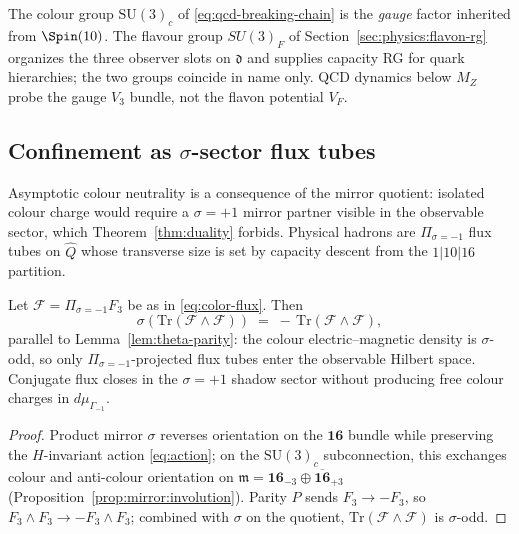 \begin{remark}
The colour group $\mathrm{SU}(3)_c$ of \eqref{eq:qcd-breaking-chain} is the
\emph{gauge} factor inherited from $\Spin(10)$. The flavour group
$SU(3)_F$ of Section~\ref{sec:physics:flavon-rg} organizes the three observer
slots on $\mathfrak{d}$ and supplies capacity RG for quark hierarchies; the
two groups coincide in name only. QCD dynamics below $M_Z$ probe the gauge
$V_3$ bundle, not the flavon potential $V_F$.
\end{remark}

\subsection{Confinement as $\sigma$-sector flux tubes}
\label{sec:qcd:confinement}

Asymptotic colour neutrality is a consequence of the mirror quotient: isolated
colour charge would require a $\sigma=+1$ mirror partner visible in the
observable sector, which Theorem~\ref{thm:duality} forbids. Physical
hadrons are $\Pi_{\sigma=-1}$ flux tubes on $\hat Q$ whose transverse size
is set by capacity descent from the $1|10|16$ partition.

\begin{lemma}
\label{lem:color-flux-sigma}
Let $\mathcal{F}=\Pi_{\sigma=-1}F_3$ be as in \eqref{eq:color-flux}. Then
\begin{equation}\label{eq:flux-sigma-odd}
  \sigma(\mathrm{Tr}(\mathcal{F}\wedge\mathcal{F}))
  \;=\;
  -\,\mathrm{Tr}(\mathcal{F}\wedge\mathcal{F}),
\end{equation}
parallel to Lemma~\ref{lem:theta-parity}: the colour electric--magnetic
density is $\sigma$-odd, so only $\Pi_{\sigma=-1}$-projected flux tubes
enter the observable Hilbert space. Conjugate flux closes in the
$\sigma=+1$ shadow sector without producing free colour charges in
$d\mu_{\Gamma_{-1}}$.
\end{lemma}

\begin{proof}
Product mirror $\sigma$ reverses orientation on the $\mathbf{16}$
bundle while preserving the $H$-invariant action \eqref{eq:action}; on the
$\mathrm{SU}(3)_c$ subconnection, this exchanges colour and anti-colour
orientation on $\mathfrak{m}=\mathbf{16}_{-3}\oplus\overline{\mathbf{16}}_{+3}$
(Proposition~\ref{prop:mirror:involution}). Parity $P$ sends
$F_3\to -F_3$, so $F_3\wedge F_3\to -F_3\wedge F_3$; combined with
$\sigma$ on the quotient, $\mathrm{Tr}(\mathcal{F}\wedge\mathcal{F})$ is
$\sigma$-odd.
\end{proof}

